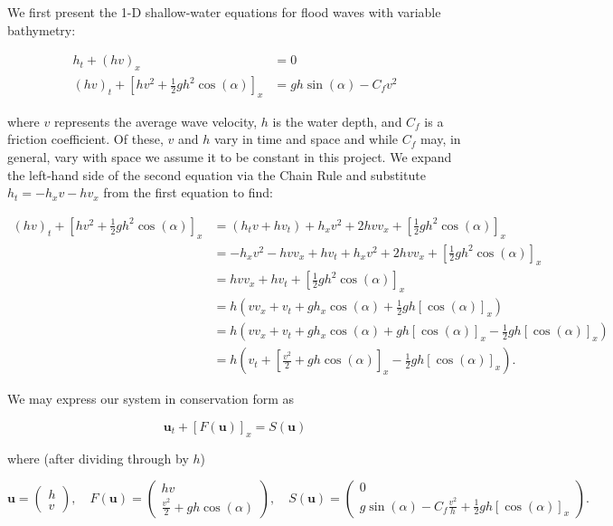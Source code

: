 We first present the 1-D shallow-water equations for flood waves with variable bathymetry\cite{whitham1999_ch3}:

\begin{align*}
    h_t + (h v)_x &= 0 \\
    (h v)_t + \left[ hv^2 + \frac{1}{2} g h^2 \cos{(\alpha)} \right]_x &= g h \sin{(\alpha)} - C_f v^2
\end{align*}

where $v$ represents the average wave velocity, $h$ is the water depth, and $C_f$ is a friction
coefficient. Of these, $v$ and $h$ vary in time and space and while $C_f$ may, in general, vary with space we assume
it to be constant in this project. We expand the left-hand side of the second equation via the Chain Rule and 
substitute $h_t = -h_x v - h v_x$ from the first equation to find: 

\begin{align*}
    (h v)_t + \left[ hv^2 + \frac{1}{2} g h^2 \cos{(\alpha)} \right]_x 
        &= \left( h_t v + h v_t \right) + h_x v^2 + 2 h v v_x + \left[ \frac{1}{2} g h^2 \cos{(\alpha)} \right]_x \\
        &= -h_x v^2 - h v v_x + h v_t + h_x v^2 + 2 h v v_x + \left[ \frac{1}{2} g h^2 \cos{(\alpha)} \right]_x \\
        &=  h v v_x + h v_t + \left[ \frac{1}{2} g h^2 \cos{(\alpha)} \right]_x \\
        &=  h \left( v v_x + v_t + g h_x \cos{(\alpha)} + \frac{1}{2} g h [\cos{(\alpha)}]_x \right) \\
        &=  h \left( v v_x + v_t + g h_x \cos{(\alpha)} + g h [\cos{(\alpha)}]_x - \frac{1}{2} g h [\cos{(\alpha)}]_x \right) \\
        &=  h \left( v_t + \left[ \frac{v^2}{2} + g h \cos{(\alpha)} \right]_x - \frac{1}{2} g h [\cos{(\alpha)}]_x \right).
\end{align*}

\pagebreak
We may express our system in conservation form as

$$
    \textbf{u}_t + \left[ F(\textbf{u}) \right]_x = S(\textbf{u})
$$

where (after dividing through by $h$)

$$
\textbf{u} = \begin{pmatrix}
    h \\
    v
\end{pmatrix}, \quad F(\textbf{u}) = \begin{pmatrix}
    hv \\
    \frac{v^2}{2} + g h \cos{(\alpha)}
\end{pmatrix}, \quad S(\textbf{u}) = \begin{pmatrix}
    0 \\
    g \sin{(\alpha)} - C_f \frac{v^2}{h} + \frac{1}{2} g h [\cos{(\alpha)}]_x
\end{pmatrix}.
$$

